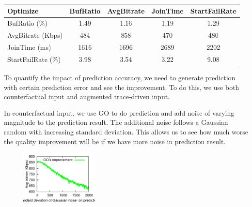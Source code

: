 \begin{table}[h!]
\begin{center}
\begin{small}
\begin{tabular}{l c c c c}
    Optimize             & BufRatio & AvgBitrate & JoinTime & StartFailRate \\ \hline
    BufRatio (\%)     & 1.49   & 1.16     & 1.19   & 1.29        \\ \hline
    AvgBitrate (Kbps)   & 484      & 858        & 470      & 480           \\ \hline
    JoinTime  (ms)    & 1616     & 1696       & 2689     & 2202          \\ \hline
    StartFailRate (\%) & 3.98   & 3.54     & 3.22   & 9.08        \\
\end{tabular}
\end{small}
\end{center}
\label{tab:cross-metrics}
\end{table}



\label{subsec:impact-accuracy}

To quantify the impact of prediction accuracy, we need to generate prediction with certain prediction error and see the improvement. To do this, we use both counterfactual input and augmented trace-driven input. 

In counterfactual input, we use GO to do prediction and add noise of varying magnitude to the prediction result. The additional noise follows a Gaussian random with increasing standard deviation.
This allows us to see how much worse the quality improvement will be if we have more noise in prediction result. 

\begin{figure}[h!]
\centering
 \includegraphics[width=0.35\textwidth] {figures/newfig/trendNoise-metricId1-keyGlobal-partition.pdf}
\label{fig:trace-accuracy-1}
\end{figure}

